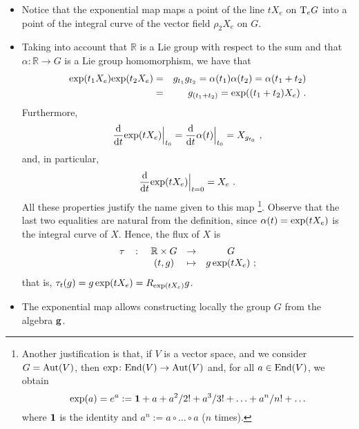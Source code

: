 \documentclass[12pt]{report}
\def\beann{\begin{eqnarray*}}
\def\eeann{\end{eqnarray*}}
\def\d{{\rm d}}
\def\Real{\mathbb{R}}
\def\Tan{{\rm T}}
\begin{document}
\begin{appendix}
\begin{itemize}
\item
Notice that the exponential map maps
a point of the line $tX_e$ on $\Tan_eG$ into
a point of the integral curve of the vector field
$\rho_2X_e$ on $G$.
\item
Taking into account that $\Real$ is a Lie group
with respect to the sum and that
$\alpha \colon \Real \to G$ 
is a Lie group homomorphism, we have that
\beann
{\rm exp}(t_1X_e){\rm exp}(t_2X_e) 
&=& g_{t_1}g_{t_2} = \alpha(t_1)\alpha(t_2) = \alpha(t_1+t_2) 
\\
&=& g_{(t_1+t_2)} = {\rm exp}((t_1+t_2)X_e) \ .
\eeann
Furthermore,
$$
\frac{\d}{\d t} {\rm exp}(tX_e)\Big\vert_{t_0} =
\frac{\d}{\d t}\alpha(t)\Big\vert_{t_0} = X_{g_{t_0}} \ ,
$$
and, in particular,
$$
\frac{\d}{\d t} {\rm exp}(tX_e)\Big\vert_{t=0} = X_e \ .
$$
All these properties justify the name given to this map
\footnote{
Another justification is that, 
if $V$ is a vector space, and we consider
$G={\rm Aut}(V)$, then
${\rm exp} \colon {\rm End}(V) \to {\rm Aut}(V)$
and, for all $a \in {\rm End}(V)$, we obtain
$$
{\rm exp}(a) =e^a := {\bf 1} + a + a^2/2! + a^3/3! + \ldots + a^n/n! + \ldots
$$
where ${\bf 1}$ is the identity and
$a^n := a \circ \ldots \circ a$ ($n$ times).}.
Observe that the last two equalities are natural
from the definition, since
$\alpha(t) = {\rm exp}(tX_e)$ 
is the integral curve of $X$. 
Hence, the flux of $X$ is
$$ 
\begin{array}{ccccc}
\tau&\colon&\Real \times G&\to&G
\\
& &(t,g)&\mapsto&g\,{\rm exp}(tX_e) \ ;
\end{array} 
$$
that is,
$\tau_t(g) = g\,{\rm exp}(tX_e) = R_{{\rm exp}(tX_e)}g$.
\item
The exponential map allows constructing locally the group $G$
from the algebra ${\bf g}$.
\end{itemize}

\end{appendix}





\small
{}
\label{Chap:Bibliography}
%

\end{document}
